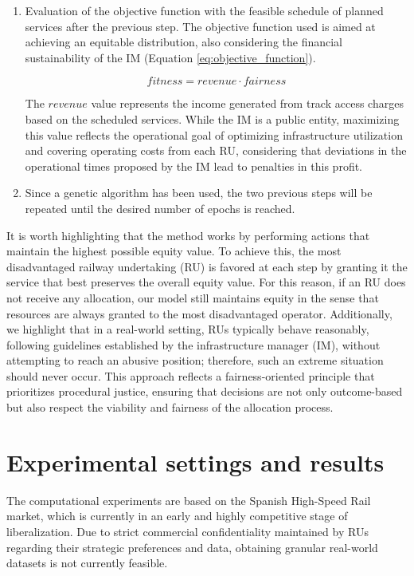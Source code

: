 \documentclass[preprint,12pt]{elsarticle}
\begin{document}
\begin{enumerate}
    \item Evaluation of the objective function with the feasible schedule of planned services after the previous step. The objective function used is aimed at achieving an equitable distribution, also considering the financial sustainability of the \gls{IM} (Equation \ref{eq:objective_function}).

    \begin{equation}
        fitness = revenue \cdot fairness
        \label{eq:objective_function}
    \end{equation}

    The $revenue$ value represents the income generated from track access charges based on the scheduled services. While the \gls{IM} is a public entity, maximizing this value reflects the operational goal of optimizing infrastructure utilization and covering operating costs from each \gls{RU}, considering that deviations in the operational times proposed by the \gls{IM} lead to penalties in this profit.
    
    \item Since a genetic algorithm has been used, the two previous steps will be repeated until the desired number of epochs is reached. 
\end{enumerate}

It is worth highlighting that the method works by performing actions that maintain the highest possible equity value. To achieve this, the most disadvantaged railway undertaking (RU) is favored at each step by granting it the service that best preserves the overall equity value. For this reason, if an RU does not receive any allocation, our model still maintains equity in the sense that resources are always granted to the most disadvantaged operator. Additionally, we highlight that in a real-world setting, RUs typically behave reasonably, following guidelines established by the infrastructure manager (IM), without attempting to reach an abusive position; therefore, such an extreme situation should never occur. This approach reflects a fairness-oriented principle that prioritizes procedural justice, ensuring that decisions are not only outcome-based but also respect the viability and fairness of the allocation process.

\section{Experimental settings and results}\label{sec:Tests}

The computational experiments are based on the Spanish High-Speed Rail market, which is currently in an early and highly competitive stage of liberalization. Due to strict commercial confidentiality maintained by \glspl{RU} regarding their strategic preferences and data, obtaining granular real-world datasets is not currently feasible.
\end{document}
